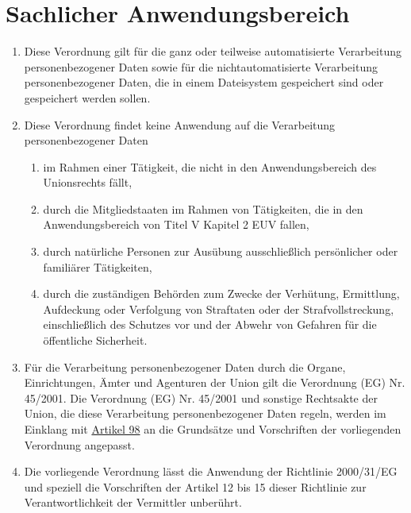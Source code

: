 \chapter{Sachlicher Anwendungsbereich}
\label{ch:2}


\begin{enumerate}

  \item Diese Verordnung gilt für die ganz oder teilweise automatisierte Verarbeitung personenbezogener Daten sowie für
   die nichtautomatisierte Verarbeitung personenbezogener Daten, die in einem Dateisystem gespeichert sind oder
   gespeichert werden sollen.
  \label{itm:02-1}

  \item Diese Verordnung findet keine Anwendung auf die Verarbeitung personenbezogener Daten
  \label{itm:02-2}

  \begin{enumerate}
  
    \item im Rahmen einer Tätigkeit, die nicht in den Anwendungsbereich des Unionsrechts fällt,
    \label{itm:02-2a}

    \item durch die Mitgliedstaaten im Rahmen von Tätigkeiten, die in den Anwendungsbereich von Titel V Kapitel 2
     EUV fallen,
    \label{itm:02-2b}

    \item durch natürliche Personen zur Ausübung ausschließlich persönlicher oder familiärer Tätigkeiten,
    \label{itm:02-2c}

    \item durch die zuständigen Behörden zum Zwecke der Verhütung, Ermittlung, Aufdeckung oder Verfolgung von Straftaten
     oder der Strafvollstreckung, einschließlich des Schutzes vor und der Abwehr von Gefahren für die öffentliche
     Sicherheit.
    \label{itm:02-2d}

  \end{enumerate}

  \item Für die Verarbeitung personenbezogener Daten durch die Organe, Einrichtungen, Ämter und Agenturen der Union gilt
   die Verordnung (EG) Nr. 45/2001. Die Verordnung (EG) Nr. 45/2001 und sonstige Rechtsakte der Union, die diese
   Verarbeitung personenbezogener Daten regeln, werden im Einklang mit \hyperref[ch:98]{Artikel 98} an
   die Grundsätze und Vorschriften der vorliegenden Verordnung angepasst.
  \label{itm:02-3}

  \item Die vorliegende Verordnung lässt die Anwendung der Richtlinie 2000/31/EG und speziell die Vorschriften der
   Artikel 12 bis 15 dieser Richtlinie zur Verantwortlichkeit der Vermittler unberührt.
  \label{itm:02-4}

\end{enumerate}

